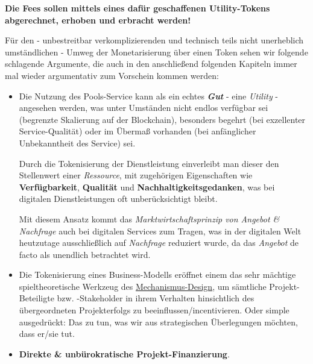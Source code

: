 \begin{Praemisse}
\label{fees-for-token}
\vspace{0.2cm}

\textbf{Die Fees sollen mittels eines dafür geschaffenen Utility-Tokens abgerechnet, erhoben und erbracht werden!}

\vspace{0.5cm} 

Für den - unbestreitbar verkomplizierenden und technisch teils nicht unerheblich umständlichen - Umweg der Monetarisierung über einen Token sehen wir folgende schlagende Argumente, die auch in den anschließend folgenden Kapiteln immer mal wieder argumentativ zum Vorschein kommen werden:

\begin{itemize}
	\item Die Nutzung des Pools-Service kann als ein echtes \textit{\textbf{Gut}} - eine \textit{Utility} - angesehen werden, was unter Umständen nicht endlos verfügbar sei (begrenzte Skalierung auf der Blockchain), besonders begehrt (bei exzellenter Service-Qualität) oder im Übermaß vorhanden (bei anfänglicher Unbekanntheit des Service) sei. 
	
	Durch die Tokenisierung der Dienstleistung einverleibt man dieser den Stellenwert einer \textit{Ressource}, mit zugehörigen Eigenschaften wie \textbf{Verfügbarkeit}, \textbf{Qualität} und \textbf{Nachhaltigkeitsgedanken}, was bei digitalen Dienstleistungen oft unberücksichtigt bleibt. 
	
	Mit diesem Ansatz kommt das \textit{Marktwirtschaftsprinzip von Angebot \& Nachfrage} auch bei digitalen Services zum Tragen, was in der digitalen Welt heutzutage ausschließlich auf \textit{Nachfrage} reduziert wurde, da das \textit{Angebot} de facto als unendlich betrachtet wird.
	\item Die Tokenisierung eines Business-Modells eröffnet einem das sehr mächtige spieltheoretische Werkzeug des \href{https://de.wikipedia.org/wiki/Mechanismus-Design-Theorie}{Mechanismus-Design}, um sämtliche Projekt-Beteiligte bzw. -Stakeholder in ihrem Verhalten hinsichtlich des übergeordneten Projekterfolgs zu beeinflussen/incentivieren. Oder simple ausgedrückt: Das zu tun, was wir aus strategischen Überlegungen möchten, dass er/sie tut.
	\item \textbf{Direkte \& unbürokratische Projekt-Finanzierung}.
	

\end{itemize}
\end{Praemisse}
